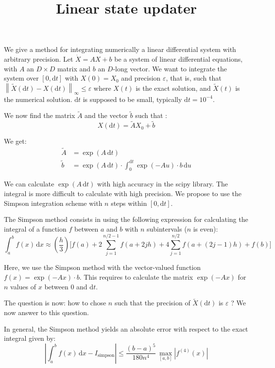\documentclass[a4paper]{article}
\title{Linear state updater}
\author{}
\newcommand{\dt}{\mathrm{d}t}
\newcommand{\dx}{\mathrm{d}x}
\newcommand{\norminf}[1]{\left\| #1 \right\|_\infty}
\newcommand{\eps}{\varepsilon}
\begin{document}
\maketitle

We give a method for integrating numerically a linear differential system
with arbitrary precision. Let $\dot X = AX+b$ be a system of linear differential
equations, with $A$ an $D \times D$ matrix and $b$ an $D$-long vector.
We want to integrate the system over $[0,\dt]$ with $X(0) = X_0$ and precision
$\eps$, that is, such that $\norminf{\widetilde X(\dt)-X(\dt)} \leq \eps$ where
$X(t)$ is the exact solution, and $\widetilde X(t)$ is the numerical solution.
$\dt$ is supposed to be small, typically $\dt = 10^{-4}$.

We now find the matrix $\widetilde A$ and the vector $\widetilde b$ such that :
\begin{equation}
X(\dt) = \widetilde A X_0 + \widetilde b
\end{equation}

We get:
\begin{align}
\widetilde A &= \exp(A \,\dt)\\
\widetilde b &= \exp(A \,\dt) \cdot \int_0^{\dt} \exp(-A u) \cdot b \, \mathrm{d}u
\end{align}

We can calculate $\exp(A \, \dt)$ with high accuracy in the scipy library. 
The integral is more difficult to calculate with high precision. We propose
to use the Simpson integration scheme with $n$ steps within $[0,\dt]$.

The Simpson method consists in using the following expression for calculating
the integral of a function $f$ between $a$ and $b$ with $n$ subintervals ($n$ is even):
\begin{equation}
\int_a^b f(x) \, \dx\approx 
\left(\frac{h}{3}\right) \bigg[f(a)+2\sum_{j=1}^{n/2-1}f(a+2jh)+
4\sum_{j=1}^{n/2}f(a+(2j-1)h)+f(b)
\bigg]
\end{equation}

Here, we use the Simpson method with the vector-valued function $f(x) = \exp(-A x) \cdot b$.
This requires to calculate the matrix $\exp(-A x)$ for $n$ values of $x$ between $0$ and $\dt$.

The question is now: how to chose $n$ such that the precision of $\widetilde X(\dt)$ is 
$\eps$ ?
We now answer to this question.

In general, the Simpson method yields an absolute error with respect to the exact integral 
given by:
\begin{equation}
\left| \int_a^b f(x) \, \dx - I_{\textrm{simpson}} \right| \leq
\frac{(b-a)^5}{180 n^4} \, \max_{[a,b]} |f^{(4)}(x)|
\end{equation}
\end{document}
